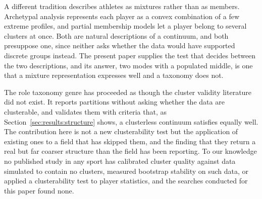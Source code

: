 A different tradition describes athletes as mixtures rather than as members. Archetypal
analysis \citep{eugster2012performance} represents each player as a convex combination of
a few extreme profiles, and partial membership models \citep{seri2024partial} let a player
belong to several clusters at once. Both are natural descriptions of a continuum, and both
presuppose one, since neither asks whether the data would have supported discrete groups
instead. The present paper supplies the test that decides between the two descriptions,
and its answer, two modes with a populated middle, is one that a mixture representation
expresses well and a taxonomy does not.

The role taxonomy genre has proceeded as though the cluster validity literature did not
exist. It reports partitions without asking whether the data are clusterable, and
validates them with criteria that, as Section~\ref{sec:results:structure} shows, a
clusterless continuum satisfies equally well. The contribution here is not a new
clusterability test but the application of existing ones to a field that has skipped
them, and the finding that they return a real but far coarser structure than the field has
been reporting. To our knowledge no published study in any sport has calibrated cluster
quality against data simulated to contain no clusters, measured bootstrap stability on
such data, or applied a clusterability test to player statistics, and the searches
conducted for this paper found none.
